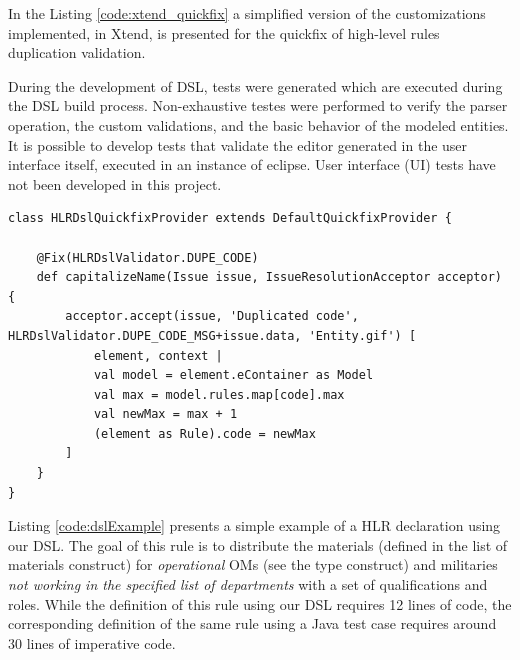 \documentclass[twocolumn]{bmcart}%
\newcommand{\shc}{HLR\xspace}
\begin{document}

In the Listing \ref{code:xtend_quickfix} a simplified version of the customizations implemented, in Xtend, is presented for the quickfix of high-level rules duplication validation.





During the development of DSL, tests were generated which are executed during the DSL build process. Non-exhaustive testes were performed to verify the parser operation, the custom validations, and the basic behavior of the modeled entities. It is possible to develop tests that validate the editor generated in the user interface itself, executed in an instance of eclipse. User interface (UI) tests have not been developed in this project.

\begin{small}
\begin{lstlisting}[frame=single, language=Xtend, caption={\it Quickfix Customization}, label={code:xtend_quickfix}]
class HLRDslQuickfixProvider extends DefaultQuickfixProvider {

	@Fix(HLRDslValidator.DUPE_CODE)
	def capitalizeName(Issue issue, IssueResolutionAcceptor acceptor) {
		acceptor.accept(issue, 'Duplicated code', HLRDslValidator.DUPE_CODE_MSG+issue.data, 'Entity.gif') [
			element, context |
			val model = element.eContainer as Model
			val max = model.rules.map[code].max
			val newMax = max + 1			
			(element as Rule).code = newMax
		]
	}
}
\end{lstlisting}
\end{small}

Listing \ref{code:dslExample} presents a simple example of a \shc declaration using our DSL. The goal of this rule is to distribute the materials (defined in the list of materials construct) for \emph{operational} OMs (see the type construct) and militaries \emph{not working in the specified list of departments} with a set of qualifications and roles. While the definition of this rule using our DSL requires 12 lines of code, the corresponding definition of the same rule using a Java test case requires around 30 lines of imperative code.
\end{document}
